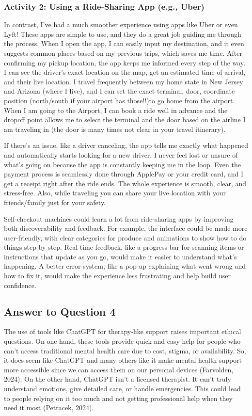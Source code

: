 \documentclass[
	letterpaper, %
]{jdf}
\begin{document}
\subsubsection {Activity 2: Using a Ride-Sharing App (e.g., Uber)}
In contrast, I’ve had a much smoother experience using apps like Uber or even Lyft! These apps are simple to use, and they do a great job guiding me through the process. When I open the app, I can easily input my destination, and it even suggests common places based on my previous trips, which saves me time. After confirming my pickup location, the app keeps me informed every step of the way. I can see the driver’s exact location on the map, get an estimated time of arrival, and their live location. I travel frequently between my home state in New Jersey and Arizona (where I live), and I can set the exact terminal, door, coordinate position (north/south if your airport has those!!)to go home from the airport. When I am going to the Airport, I can book a ride well in advance and the dropoff point allows me to select the terminal and the door based on the airline I am traveling in (the door is many times not clear in your travel itinerary).

If there’s an issue, like a driver canceling, the app tells me exactly what happened and automatically starts looking for a new driver. I never feel lost or unsure of what’s going on because the app is constantly keeping me in the loop. Even the payment process is seamlessly done through ApplePay or your credit card, and I get a receipt right after the ride ends. The whole experience is smooth, clear, and stress-free. Also, while traveling you can share your live location with your friends/family just for your safety. 

Self-checkout machines could learn a lot from ride-sharing apps by improving both discoverability and feedback. For example, the interface could be made more user-friendly, with clear categories for produce and animations to show how to do things step by step. Real-time feedback, like a progress bar for scanning items or instructions that update as you go, would make it easier to understand what’s happening. A better error system, like a pop-up explaining what went wrong and how to fix it, would make the experience less frustrating and help build user confidence.
\newpage

\subsection{Answer to Question 4}
The use of tools like ChatGPT for therapy-like support raises important ethical questions. On one hand, these tools provide quick and easy help for people who can’t access traditional mental health care due to cost, stigma, or availability. So, it does seem like ChatGPT and many others like it make mental health support more accessible since we can access them on our personal devices (Farvolden, 2024). On the other hand, ChatGPT isn’t a licensed therapist. It can’t truly understand emotions, give detailed care, or handle emergencies. This could lead to people relying on it too much and not getting professional help when they need it most (Petracek, 2024).
\end{document}
